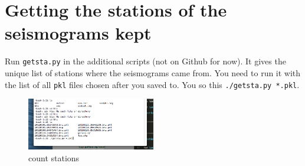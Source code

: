 \documentclass[letterpaper,10pt]{article}
\begin{document}
\section{Getting the stations of the seismograms kept}


Run \verb"getsta.py" in the additional scripts (not on Github for now). It gives the unique list of stations where the seismograms came from. You need to run it with the list of all \verb"pkl" files chosen after you saved to. You so this \verb"./getsta.py *.pkl". 


\begin{figure}[h!]
  \centering
  \includegraphics[width=0.5\textwidth]{images/count_stations}
  \caption{count stations}
  \label{fig:count_stations}
\end{figure}
\end{document}
